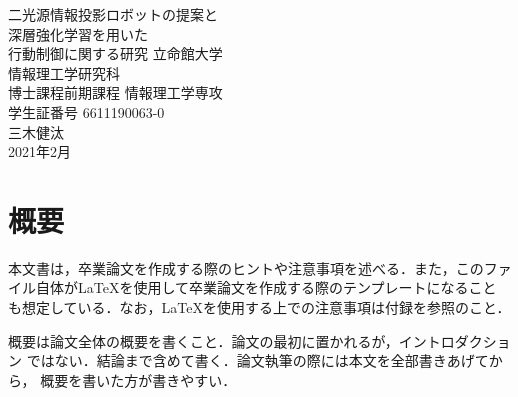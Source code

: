 \documentclass[12pt]{sonota/aislab}
\begin{document}

\begin{titlepage}
\centering
\vspace*{3truecm}
\Huge


二光源情報投影ロボットの提案と\\
深層強化学習を用いた\\
行動制御に関する研究
\vfill
\Large
立命館大学\\
情報理工学研究科\\
博士課程前期課程 情報理工学専攻\\[1zh]
学生証番号 6611190063-0\\[0.5zh]
{\LARGE{三木健汰}}\\[2zh]
2021年2月
\end{titlepage}


\let\cleardoublepage\clearpage

\frontmatter

\clearpage
{}
\chapter*{概要}
本文書は，卒業論文を作成する際のヒントや注意事項を述べる．また，このファ
イル自体が{\LaTeX}を使用して卒業論文を作成する際のテンプレートになること
も想定している．なお，{\LaTeX}を使用する上での注意事項は付録を参照のこと．

概要は論文全体の概要を書くこと．論文の最初に置かれるが，イントロダクション
ではない．結論まで含めて書く．論文執筆の際には本文を全部書きあげてから，
概要を書いた方が書きやすい．

\clearpage
{}
\bgroup

\tableofcontents
\clearpage
{}
\listoffigures 
\clearpage
{}
\listoftables
\end{document}
